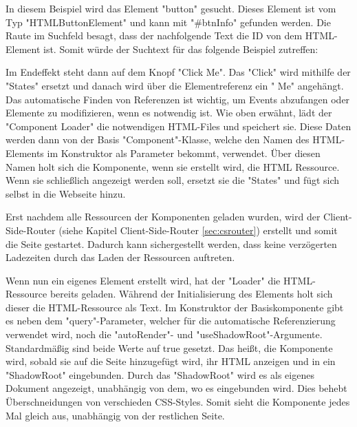 In diesem Beispiel wird das Element "{\ttfamily button}" gesucht. Dieses Element ist vom Typ "{\ttfamily HTMLButtonElement}" und kann mit "{\ttfamily \#btnInfo}" gefunden werden. Die Raute im Suchfeld besagt, dass der nachfolgende Text die ID von dem HTML-Element ist. Somit würde der Suchtext für das folgende Beispiel zutreffen:


Im Endeffekt steht dann auf dem Knopf "Click Me". Das "Click" wird mithilfe der
"States" ersetzt und danach wird über die Elementreferenz ein " Me" angehängt. Das automatische Finden von Referenzen ist wichtig, um Events abzufangen oder Elemente zu modifizieren, wenn es notwendig ist.
Wie oben erwähnt, lädt der "Component Loader" die notwendigen HTML-Files und speichert sie. Diese Daten werden dann von der Basis "Component"-Klasse, welche den Namen des HTML-Elements im Konstruktor als Parameter bekommt, verwendet. Über diesen Namen holt sich die Komponente, wenn sie erstellt wird, die HTML Ressource. Wenn sie schließlich angezeigt werden soll, ersetzt sie die "States" und fügt sich selbst in die Webseite hinzu.


Erst nachdem alle Ressourcen der Komponenten geladen wurden, wird der Client-Side-Router (siehe Kapitel Client-Side-Router \ref{sec:csrouter}) erstellt und somit die Seite gestartet. Dadurch kann sichergestellt werden, dass keine verzögerten Ladezeiten durch das Laden der Ressourcen auftreten.

\begin{minipage}{\textwidth}
    
    Wenn nun ein eigenes Element erstellt wird, hat der "Loader" die HTML-Ressource bereits geladen. Während der Initialisierung des Elements holt sich dieser die HTML-Ressource als Text. Im Konstruktor der Basiskomponente gibt es neben dem "query"-Parameter, welcher für die automatische Referenzierung verwendet wird, noch die "autoRender"- und "useShadowRoot"-Argumente. Standardmäßig sind beide Werte auf {\ttfamily true} gesetzt. Das heißt, die Komponente wird, sobald sie auf die Seite hinzugefügt wird, ihr HTML anzeigen und in ein "ShadowRoot" eingebunden. Durch das "ShadowRoot" wird es als eigenes Dokument angezeigt, unabhängig von dem, wo es eingebunden wird. Dies behebt Überschneidungen von verschieden CSS-Styles. Somit sieht die Komponente jedes Mal gleich aus, unabhängig von der restlichen Seite.
\end{minipage}

